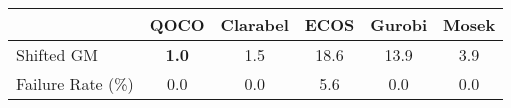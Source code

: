 \begin{tabular}{lccccc}
  \hline
   & \textbf{QOCO} & \textbf{Clarabel} & \textbf{ECOS} & \textbf{Gurobi} & \textbf{Mosek} \\ \hline
  Shifted GM & \textbf{1.0} & 1.5 & 18.6 & 13.9 & 3.9 \\ 
  Failure Rate (\%) & 0.0 & 0.0 & 5.6 & 0.0 & 0.0 \\ \hline 
\end{tabular}
